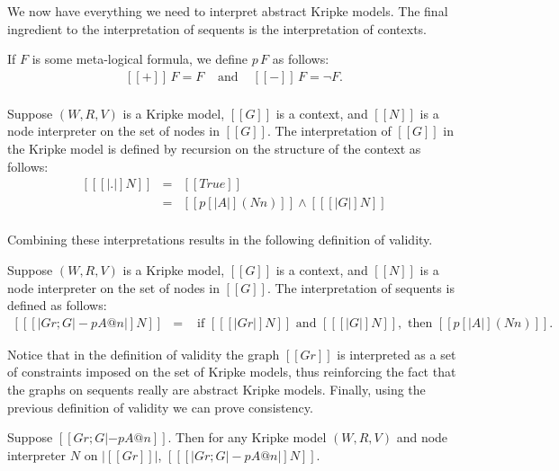 We now have everything we need to interpret abstract Kripke
models. The final ingredient to the interpretation of sequents is the
interpretation of contexts.  
\begin{definition}
  \label{def:pol_interp}
  If $F$ is some meta-logical formula, we define $p\, F$ as follows:
  \[
  \begin{array}{lll}
    [[+]]\, F = F & \text{ and } &
    [[-]]\, F = \lnot F.\\
  \end{array}
  \]
\end{definition}
\begin{definition}
  \label{def:ctx_interp}
  Suppose $(W, R, V)$ is a Kripke model, $[[G]]$ is a context, 
  and $[[N]]$ is a node interpreter on the set of nodes in $[[G]]$.
  The interpretation of
  $[[G]]$ in the Kripke model is defined by recursion on the structure
  of the context as follows:
  \[
  \begin{array}{lll}
    [[ [| . |] N ]]        & = & [[True]]\\
    [[ [| p A @ n, G |] N]] & = & [[ p [| A |] (N n) ]] \land [[ [| G |] N]]\\
  \end{array}
  \]
\end{definition}
Combining these interpretations results in the following
definition of validity.
\begin{definition}
  \label{def:validity}
  Suppose $(W, R, V)$ is a Kripke model, $[[G]]$ is a context, 
  and $[[N]]$ is a node interpreter on the set of nodes in $[[G]]$.
  The interpretation of sequents is defined as follows:
  \[
  \begin{array}{lll}
    [[ [|Gr ; G |- p A @ n |] N ]] & = & \text{ if } [[ [| Gr |] N ]] \text{ and } [[ [| G |] N]], \text{ then } [[ p [| A |] (N n)]].
  \end{array}
  \]
\end{definition}
Notice that in the definition of validity the graph $[[Gr]]$ is
interpreted as a set of constraints imposed on the set of Kripke models, thus
reinforcing the fact that the graphs on sequents really are abstract
Kripke models.  Finally, using the previous definition of validity we
can prove consistency.
\begin{thm}[Consistency]
  \label{thm:consistency}
  Suppose $[[Gr ; G |-p A @ n]]$. 
  Then for any Kripke model $(W, R, V)$ and node interpreter $N$ on $|[[Gr]]|$, $[[ [|Gr ; G |- p A @ n |] N]]$.
\end{thm}

